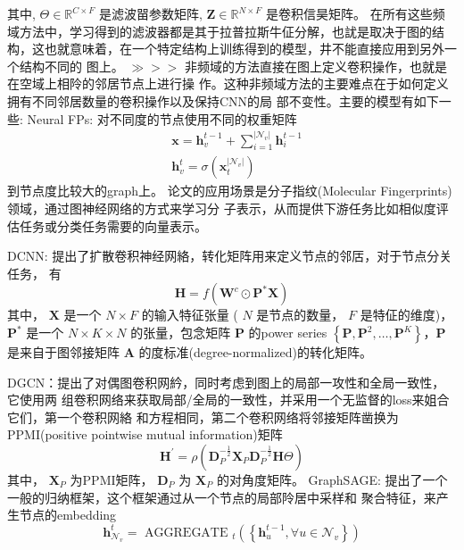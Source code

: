 \documentclass[a4paper,UTF8]{article}
\numberwithin{equation}{section}
\begin{document}
{		其中, $\Theta \in \mathbb{R}^{C \times F}$ 是滤波㽞参数矩阵, $\mathbf{Z} \in \mathbb{R}^{N \times F}$ 是卷积信昊矩阵。
		在所有这些频域方法中，学习得到的滤波器都是其于拉普拉斯牛佂分解，也訧是取决于图的结 构，这也就意味着，在一个特定结构上训练得到的模型，井不能直接应用到另外一个结构不同的 图上。
		$\gg>>$ 非频域的方法直接在图上定义卷积操作，也就是在空域上相阾的邻居节点上进行操 作。这种非频域方法的主要难点在于如何定义拥有不同邻居数量的卷积操作以及保持CNN的局 部不变性。主要的模型有如下一些:
		Neural FPs: \citep{conf/David2015}对不同度的节点使用不同的权重矩阵
		$$
		\begin{aligned}
			&\mathbf{x}=\mathbf{h}_{v}^{t-1}+\sum_{i=1}^{\left|\mathcal{N}_{v}\right|} \mathbf{h}_{i}^{t-1} \\
			&\mathbf{h}_{v}^{t}=\sigma\left(\mathbf{x}_{t}^{\left|\mathcal{N}_{v}\right|}\right)
		\end{aligned}
		$$ 到节点度比较大的graph上。
		论文的应用场景是分子指纹(Molecular Fingerprints)领域，通过图神经网络的方式来学习分 子表示，从而提供下游任务比如相似度评估任务或分类任务需要的向量表示。
		
		DCNN: \citep{conf/James2016}提出了扩散卷积神经网絡，转化矩阵用来定义节点的邻㕆，对于节点分关任务， 有
		$$
		\mathbf{H}=f\left(\mathbf{W}^{c} \odot \mathbf{P}^{*} \mathbf{X}\right)
		$$
		其中， $\mathbf{X}$ 是一个 $N \times F$ 的输入特征张量 ( $N$ 是节点的数量， $F$ 是特佂的维度)， $\mathbf{P}^{*}$ 是一个 $N \times K \times N$ 的张量，包念矩阵 $\mathbf{P}$ 的power series $\left\{\mathbf{P}, \mathbf{P}^{2}, \ldots, \mathbf{P}^{K}\right\} ， \mathbf{P}$ 是来自于图邻接矩阵 $\mathbf{A}$ 的度标准(degree-normalized)的转化矩阵。
		
		DGCN：\citep{journal/JieZhou2020}提出了对偶图卷积网紟，同时考虑到图上的局部一攻性和全局一致性，它使用两 组卷积网络来获取局部/全局的一致性，并采用一个无监督的loss来姐合它们，第一个卷积网絡 和方程相同，第二个卷积网络将邻接矩阵凿换为PPMI(positive pointwise mutual information)矩阵
		$$
		\mathbf{H}^{\prime}=\rho\left(\mathbf{D}_{P}^{-\frac{1}{2}} \mathbf{X}_{P} \mathbf{D}_{P}^{-\frac{1}{2}} \mathbf{H} \Theta\right)
		$$
		其中， $\mathbf{X}_{P}$ 为PPMI矩阵， $\mathbf{D}_{P}$ 为 $\mathbf{X}_{P}$ 的对角度矩阵。
		GraphSAGE: \citep{journal/JieZhou2020}提出了一个一般的归纳框架，这个框架通过从一个节点的局部阾居中采样和 聚合特征，来产生节点的embedding
		$$
		\mathbf{h}_{\mathcal{N}_{v}}^{t}=\text { AGGREGATE }{ }_{t}\left(\left\{\mathbf{h}_{u}^{t-1}, \forall u \in \mathcal{N}_{v}\right\}\right)
		$$
		
}
\end{document}
